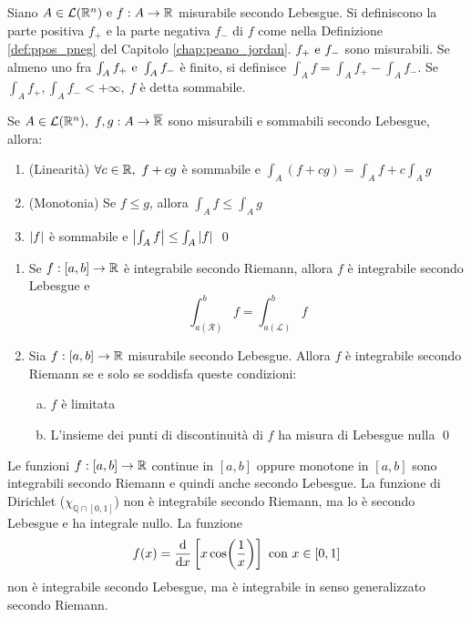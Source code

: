 \begin{definition}
	Siano $A\in\mathcal{L}(\mathbb{R}^n) \text{ e } f:A\to\mathbb{R}$ misurabile secondo Lebesgue. Si definiscono la parte positiva $f_+$ e la parte negativa $f_-$ di $f$ come nella Definizione \ref{def:ppos_pneg} del Capitolo \ref{chap:peano_jordan}. $f_+ \text{ e } f_-$ sono misurabili. Se almeno uno fra $\int_A f_+ \text{ e } \int_A f_-$ è finito, si definisce $\int_A f= \int_A f_+ - \int_A f_-$. Se $\int_A f_+,\int_A f_- <+\infty, \ f$ è detta sommabile.
\end{definition}

\begin{theorem}
	Se $A \in \mathcal{L}(\mathbb{R}^n), \ f,g:A \to \overline{\mathbb{R}}$ sono misurabili e sommabili secondo Lebesgue, allora:
	\begin{enumerate}
		\item (Linearità) $\forall c \in \R, \ f+cg$ è sommabile e $\int_A(f+cg)=\int_Af+c\int_Ag$
		\item (Monotonia) Se $f\leq g$, allora $\int_Af\leq\int_Ag$
		\item $\abs{f}$ è sommabile e $\abs{\int_Af}\leq\int_A\abs{f}$
		\qed
	\end{enumerate}
\end{theorem}

\begin{theorem}\leavevmode
	\begin{enumerate}
		\item Se $f:[a,b]\to\mathbb{R}$ è integrabile secondo Riemann, allora $f$ è integrabile secondo Lebesgue e $$\int_{a(\mathcal{R})}^bf=\int_{a(\mathcal{L})}^{b}f$$
		\item Sia $f:[a,b]\to\mathbb{R}$ misurabile secondo Lebesgue. Allora $f$ è integrabile secondo Riemann se e solo se soddisfa queste condizioni:
		\begin{enumerate}[a.]
			\item $f$ è limitata
			\item L'insieme dei punti di discontinuità di $f$ ha misura di Lebesgue nulla
			\qed
		\end{enumerate}
	\end{enumerate}
\end{theorem}

Le funzioni $f:[a,b]\to\mathbb{R}$ continue in $[a,b]$ oppure monotone in $[a,b]$ sono integrabili secondo Riemann e quindi anche secondo Lebesgue. La funzione di Dirichlet ($\chi_{\mathbb{Q}\cap[0,1]}$) non è integrabile secondo Riemann, ma lo è secondo Lebesgue e ha integrale nullo. La funzione
$$
	f(x)=\frac{\dd}{\dd x}\left[x\cos(\frac{1}{x})\right] \text{ con } x \in [0,1]
$$
non è integrabile secondo Lebesgue, ma è integrabile in senso generalizzato secondo Riemann.

